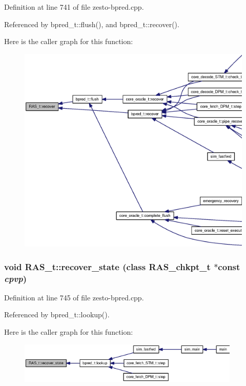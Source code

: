 Definition at line 741 of file zesto-bpred.cpp.

Referenced by bpred\_\-t::flush(), and bpred\_\-t::recover().

Here is the caller graph for this function:\nopagebreak
\begin{figure}[H]
\begin{center}
\leavevmode
\includegraphics[width=420pt]{classRAS__t_abae08514fc83550748c20d576670cf7_icgraph}
\end{center}
\end{figure}
\subsubsection[{recover\_\-state}]{\setlength{\rightskip}{0pt plus 5cm}void RAS\_\-t::recover\_\-state (class {\bf RAS\_\-chkpt\_\-t} $\ast$const {\em cpvp})\hspace{0.3cm}{\tt  [virtual]}}\label{classRAS__t_34fda2c32bc8bc2787c544b00a0984de}




Definition at line 745 of file zesto-bpred.cpp.

Referenced by bpred\_\-t::lookup().

Here is the caller graph for this function:\nopagebreak
\begin{figure}[H]
\begin{center}
\leavevmode
\includegraphics[width=300pt]{classRAS__t_34fda2c32bc8bc2787c544b00a0984de_icgraph}
\end{center}
\end{figure}

